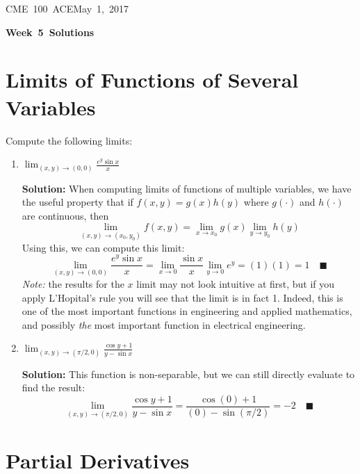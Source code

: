 \documentclass[letterpaper, 11pt]{article}
\makeatletter
\newcommand{\hmwkTitle}{Week\ 5\ Solutions} %
\newcommand{\hmwkClass}{CME\ 100\ ACE} %
\newcommand{\hmwkAuthorName}{Timothy Anderson} %
\newcommand{\hmwkAuthorEmail}{timmya@stanford.edu} %
\makeatother
\begin{document}
\noindent
\normalsize 
\hmwkClass \hfill May\ 1,\ 2017\\

\begin{center} \Large \textbf{\hmwkTitle} \end{center}

\section{Limits of Functions of Several Variables}
Compute the following limits:
\begin{enumerate}[label=(\alph*)]
\item $\lim_{(x,y) \to (0,0)} \frac{e^y \sin x}{x} $
\par \textbf{Solution:} When computing limits of functions of multiple variables, we have the useful property that if $f(x,y) = g(x)h(y)$ where $g(\cdot)$ and $h(\cdot)$ are continuous, then 
\[ \lim_{(x,y) \to (x_0, y_0)}f(x,y) = \lim_{x \to x_0} g(x) \lim_{y \to y_0} h(y) \]
Using this, we can compute this limit:
\[ \lim_{(x,y) \to (0,0)} \frac{e^y \sin x}{x} = \lim_{x \to 0} \frac{\sin x}{x} \lim_{y \to 0} e^y = (1) (1) = 1 \quad\blacksquare\]
\textit{Note:} the results for the $x$ limit may not look intuitive at first, but if you apply L'Hopital's rule you will see that the limit is in fact 1. Indeed, this is one of the most important functions in engineering and applied mathematics, and possibly \textit{the} most important function in electrical engineering. 

\item $\lim_{(x,y) \to (\pi/2,0)} \frac{ \cos y + 1}{ y- \sin x} $
\par \textbf{Solution:} This function is non-separable, but we can still directly evaluate to find the result:
\[ \lim_{(x,y) \to (\pi/2,0)} \frac{ \cos y + 1}{ y- \sin x}  =  \frac{ \cos (0) + 1}{ (0) - \sin (\pi/2)} = - 2 \quad\blacksquare \]

\end{enumerate}

\section{Partial Derivatives}
\end{document}
